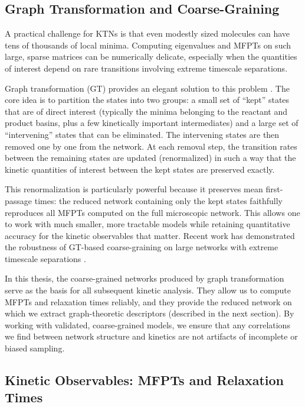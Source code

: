 \subsection{Graph Transformation and Coarse-Graining}

A practical challenge for KTNs is that even modestly sized molecules can have tens of thousands of local minima. Computing eigenvalues and MFPTs on such large, sparse matrices can be numerically delicate, especially when the quantities of interest depend on rare transitions involving extreme timescale separations.

Graph transformation (GT) provides an elegant solution to this problem \cite{Trygubenko2006GT,Stevenson2014GT,Wales2024FPT}. The core idea is to partition the states into two groups: a small set of ``kept'' states that are of direct interest (typically the minima belonging to the reactant and product basins, plus a few kinetically important intermediates) and a large set of ``intervening'' states that can be eliminated. The intervening states are then removed one by one from the network. At each removal step, the transition rates between the remaining states are updated (renormalized) in such a way that the kinetic quantities of interest between the kept states are preserved exactly.

This renormalization is particularly powerful because it preserves mean first-passage times: the reduced network containing only the kept states faithfully reproduces all MFPTs computed on the full microscopic network. This allows one to work with much smaller, more tractable models while retaining quantitative accuracy for the kinetic observables that matter. Recent work has demonstrated the robustness of GT-based coarse-graining on large networks with extreme timescale separations \cite{Stevenson2014GT,Wales2024FPT}.

In this thesis, the coarse-grained networks produced by graph transformation serve as the basis for all subsequent kinetic analysis. They allow us to compute MFPTs and relaxation times reliably, and they provide the reduced network on which we extract graph-theoretic descriptors (described in the next section). By working with validated, coarse-grained models, we ensure that any correlations we find between network structure and kinetics are not artifacts of incomplete or biased sampling.

\subsection{Kinetic Observables: MFPTs and Relaxation Times}

